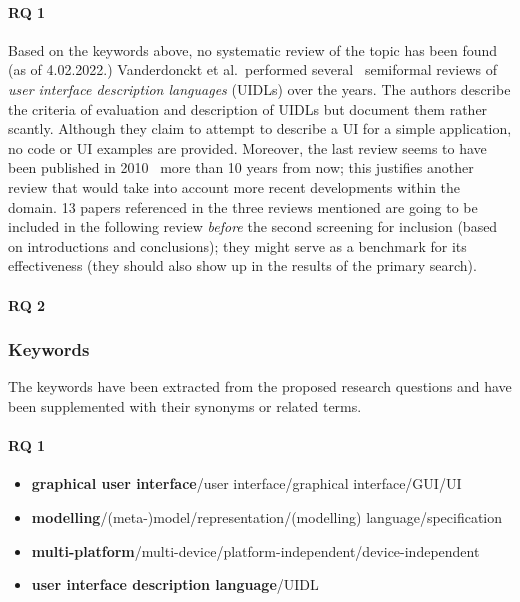 \paragraph{RQ 1}
Based on the keywords above, no systematic review of the topic has been found (as of 4.02.2022.)
Vanderdonckt et al.\ performed several~\cite{souchon_review_2003,guerrero_garcia_theoretical_2009,guerrero_garcia_theoretical_2011}
semiformal reviews of \emph{user interface description languages} (UIDLs) over the years.
The authors describe the criteria of evaluation and description of UIDLs but document them rather scantly.
Although they claim to attempt to describe a UI for a simple application, no code or UI examples are provided.
Moreover, the last review seems to have been published in 2010 \textendash\ more than 10 years from now;
this justifies another review that would take into account more recent developments within the domain.
13 papers referenced in the three reviews mentioned are going to be included in the following review
\emph{before} the second screening for inclusion (based on introductions and conclusions);
they might serve as a benchmark for its effectiveness (they should also show up in the results of the primary search).

\paragraph{RQ 2}

\subsubsection{Keywords}
The keywords have been extracted from the proposed research questions
and have been supplemented with their synonyms or related terms.

\paragraph{RQ 1}

\begin{itemize}
    \item \textbf{graphical user interface}/user interface/graphical interface/GUI/UI
    \item \textbf{modelling}/(meta-)model/representation/(modelling) language/specification
    \item \textbf{multi-platform}/multi-device/platform-independent/device-independent
    \item \textbf{user interface description language}/UIDL
\end{itemize}

